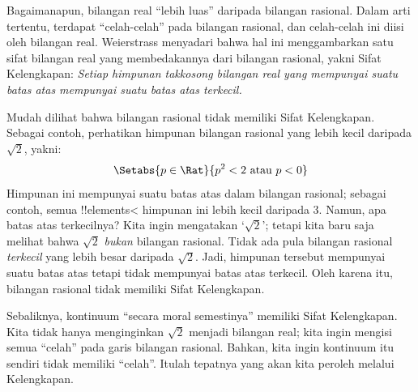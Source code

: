 \documentclass[../../../include/open-logic-section]{subfiles}
\begin{document}
Bagaimanapun, bilangan real ``lebih luas'' daripada bilangan rasional. Dalam
arti tertentu, terdapat ``celah-celah'' pada bilangan rasional, dan celah-celah
ini diisi oleh bilangan real. Weierstrass menyadari bahwa hal ini menggambarkan
satu sifat bilangan real yang membedakannya dari bilangan rasional, yakni Sifat
Kelengkapan: \emph{Setiap himpunan takkosong bilangan real yang mempunyai suatu
batas atas mempunyai suatu batas atas terkecil.}

Mudah dilihat bahwa bilangan rasional tidak memiliki Sifat Kelengkapan. Sebagai
contoh, perhatikan himpunan bilangan rasional yang lebih kecil daripada
$\sqrt{2}$, yakni:
\[
	\Setabs{p \in \Rat}{p^2 < 2 \text{ atau }p < 0}
\]
Himpunan ini mempunyai suatu batas atas dalam bilangan rasional; sebagai
contoh, semua !!{element}s< himpunan ini lebih kecil daripada $3$. Namun, apa
batas atas terkecilnya? Kita ingin mengatakan `$\sqrt{2}$'; tetapi kita baru
saja melihat bahwa $\sqrt{2}$ \emph{bukan} bilangan rasional. Tidak ada pula
bilangan rasional \emph{terkecil} yang lebih besar daripada $\sqrt{2}$. Jadi,
himpunan tersebut mempunyai suatu batas atas tetapi tidak mempunyai batas atas
terkecil. Oleh karena itu, bilangan rasional tidak memiliki Sifat Kelengkapan.

Sebaliknya, kontinuum ``secara moral semestinya'' memiliki Sifat Kelengkapan.
Kita tidak hanya menginginkan $\sqrt{2}$ menjadi bilangan real; kita ingin
mengisi semua ``celah'' pada garis bilangan rasional. Bahkan, kita ingin
kontinuum itu sendiri tidak memiliki ``celah''. Itulah tepatnya yang akan kita
peroleh melalui Kelengkapan.
\end{document}
